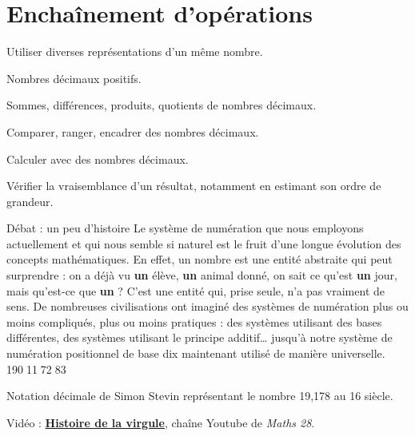 \themeN
\chapter{Enchaînement d'opérations}
\label{S01}

\programme%
   {\item Utiliser diverses représentations d'un même nombre.
    \item Nombres décimaux positifs.
    \item Sommes, différences, produits, quotients de nombres décimaux.}
   {\item Comparer, ranger, encadrer des nombres décimaux.
    \item Calculer avec des nombres décimaux.
    \item Vérifier la vraisemblance d'un résultat, notamment en estimant son ordre de grandeur.}

\vfill


\begin{debat}{Débat : un peu d'histoire}
   Le système de numération que nous employons actuellement et qui nous semble si naturel est le fruit d'une longue évolution des concepts mathématiques. En effet, un nombre est une entité abstraite qui peut surprendre : on a déjà vu {\bf un} élève, {\bf un} animal donné, on sait ce qu'est {\bf un} jour, mais qu'est-ce que {\bf un} ? C'est une entité qui, prise seule, n'a pas vraiment de sens. De nombreuses civilisations ont imaginé des systèmes de numération plus ou moins compliqués, plus ou moins pratiques : des systèmes utilisant des bases différentes, des systèmes utilisant le principe additif\dots{} jusqu'à notre système de numération positionnel de base dix maintenant utilisé de manière universelle. \medskip
   \tcblower
      {\huge 19\textcircled{\Large 0}1\textcircled{\Large 1}7\textcircled{\Large2}8\textcircled{\Large 3}} \par
      Notation décimale de Simon Stevin représentant le nombre 19,178 au 16 siècle.
\end{debat}

\hfill {\gray Vidéo : \href{https://www.youtxube.com/watch?v=bkGMa1EJkSA}{\bf Histoire de la virgule}, chaîne Youtube de {\it Maths 28}.}



